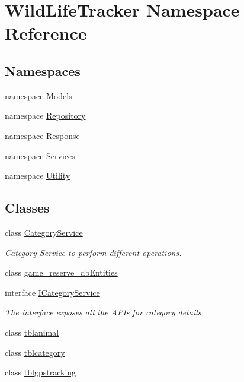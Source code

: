 \hypertarget{namespaceWildLifeTracker}{}\section{Wild\+Life\+Tracker Namespace Reference}
\label{namespaceWildLifeTracker}
\subsection*{Namespaces}
\begin{DoxyCompactItemize}
\item 
namespace \hyperlink{namespaceWildLifeTracker_1_1Models}{Models}
\item 
namespace \hyperlink{namespaceWildLifeTracker_1_1Repository}{Repository}
\item 
namespace \hyperlink{namespaceWildLifeTracker_1_1Response}{Response}
\item 
namespace \hyperlink{namespaceWildLifeTracker_1_1Services}{Services}
\item 
namespace \hyperlink{namespaceWildLifeTracker_1_1Utility}{Utility}
\end{DoxyCompactItemize}
\subsection*{Classes}
\begin{DoxyCompactItemize}
\item 
class \hyperlink{classWildLifeTracker_1_1CategoryService}{Category\+Service}
\begin{DoxyCompactList}\small\item\em Category Service to perform different operations. \end{DoxyCompactList}\item 
class \hyperlink{classWildLifeTracker_1_1game__reserve__dbEntities}{game\+\_\+reserve\+\_\+db\+Entities}
\item 
interface \hyperlink{interfaceWildLifeTracker_1_1ICategoryService}{I\+Category\+Service}
\begin{DoxyCompactList}\small\item\em The interface exposes all the A\+P\+Is for category details \end{DoxyCompactList}\item 
class \hyperlink{classWildLifeTracker_1_1tblanimal}{tblanimal}
\item 
class \hyperlink{classWildLifeTracker_1_1tblcategory}{tblcategory}
\item 
class \hyperlink{classWildLifeTracker_1_1tblgpstracking}{tblgpstracking}
\end{DoxyCompactItemize}

